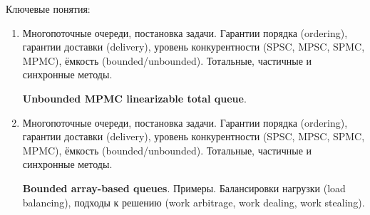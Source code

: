 \documentclass[a4paper, 12pt]{extarticle}
\begin{document}
Ключевые понятия: \concurrentQueuesNumKey

\begin{enumerate}[\thesection .1]
	
	\item Многопоточные очереди, постановка задачи. Гарантии порядка (ordering), гарантии доставки (delivery), уровень конкурентности (SPSC, MPSC, SPMC, MPMC), ёмкость (bounded/unbounded).
	Тотальные, частичные и синхронные методы.

	\textbf{Unbounded MPMC linearizable total queue}.

	\item Многопоточные очереди, постановка задачи. Гарантии порядка (ordering), гарантии доставки (delivery), уровень конкурентности (SPSC, MPSC, SPMC, MPMC), ёмкость (bounded/unbounded).
	Тотальные, частичные и синхронные методы.

	\textbf{Bounded array-based queues}. Примеры. Балансировки нагрузки (load balancing), подходы к решению (work arbitrage, work dealing, work stealing).

\end{enumerate}
\end{document}
